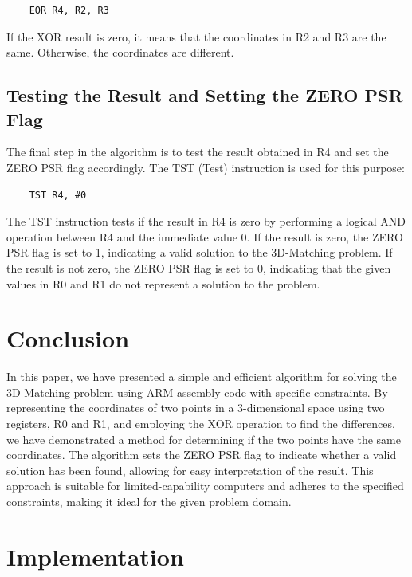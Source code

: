 \begin{verbatim}
    EOR R4, R2, R3
\end{verbatim}

If the XOR result is zero, it means that the coordinates in R2 and R3 are the same. Otherwise, the coordinates are different.

\subsection{Testing the Result and Setting the ZERO PSR Flag}

The final step in the algorithm is to test the result obtained in R4 and set the ZERO PSR flag accordingly. The TST (Test) instruction is used for this purpose:

\begin{verbatim}
    TST R4, #0
\end{verbatim}

The TST instruction tests if the result in R4 is zero by performing a logical AND operation between R4 and the immediate value 0. If the result is zero, the ZERO PSR flag is set to 1, indicating a valid solution to the 3D-Matching problem. If the result is not zero, the ZERO PSR flag is set to 0, indicating that the given values in R0 and R1 do not represent a solution to the problem.

\section{Conclusion}

In this paper, we have presented a simple and efficient algorithm for solving the 3D-Matching problem using ARM assembly code with specific constraints. By representing the coordinates of two points in a 3-dimensional space using two registers, R0 and R1, and employing the XOR operation to find the differences, we have demonstrated a method for determining if the two points have the same coordinates. The algorithm sets the ZERO PSR flag to indicate whether a valid solution has been found, allowing for easy interpretation of the result. This approach is suitable for limited-capability computers and adheres to the specified constraints, making it ideal for the given problem domain.



\section{Implementation}

